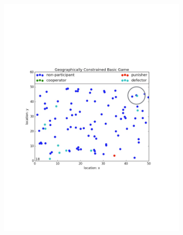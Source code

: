\documentclass[11pt]{article}
\begin{document}
\begin{figure}[!h]
\begin{subfigure}{.5\textwidth}
   \includegraphics[scale = 0.4]{9.pdf}
 \end{subfigure}
\end{figure}
\end{document}
